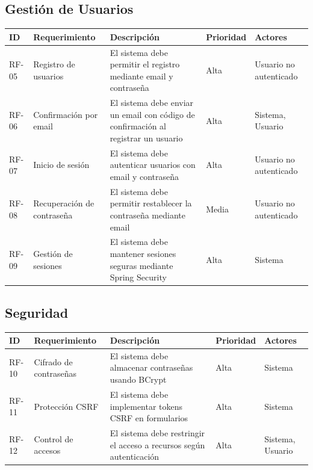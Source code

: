 \subsection{Gestión de Usuarios}

\begin{longtable}{|>{\raggedright\arraybackslash}p{1.25cm}|>{\raggedright\arraybackslash}p{3.5cm}|>{\raggedright\arraybackslash}p{5.5cm}|>{\raggedright\arraybackslash}p{1.75cm}|>{\raggedright\arraybackslash}p{2.5cm}|}
\hline
\textbf{ID} & \textbf{Requerimiento} & \textbf{Descripción} & \textbf{Prioridad} & \textbf{Actores} \\
\hline
RF-05 & Registro de usuarios & El sistema debe permitir el registro mediante email y contraseña & Alta & Usuario no autenticado \\
\hline
RF-06 & Confirmación por email & El sistema debe enviar un email con código de confirmación al registrar un usuario & Alta & Sistema, Usuario \\
\hline
RF-07 & Inicio de sesión & El sistema debe autenticar usuarios con email y contraseña & Alta & Usuario no autenticado \\
\hline
RF-08 & Recuperación de contraseña & El sistema debe permitir restablecer la contraseña mediante email & Media & Usuario no autenticado \\
\hline
RF-09 & Gestión de sesiones & El sistema debe mantener sesiones seguras mediante Spring Security & Alta & Sistema \\
\hline
\end{longtable}


\subsection{Seguridad}

\begin{longtable}{|>{\raggedright\arraybackslash}p{1.25cm}|>{\raggedright\arraybackslash}p{3.5cm}|>{\raggedright\arraybackslash}p{5.5cm}|>{\raggedright\arraybackslash}p{1.75cm}|>{\raggedright\arraybackslash}p{2.5cm}|}
\hline
\textbf{ID} & \textbf{Requerimiento} & \textbf{Descripción} & \textbf{Prioridad} & \textbf{Actores} \\
\hline
RF-10 & Cifrado de contraseñas & El sistema debe almacenar contraseñas usando BCrypt & Alta & Sistema \\
\hline
RF-11 & Protección CSRF & El sistema debe implementar tokens CSRF en formularios & Alta & Sistema \\
\hline
RF-12 & Control de accesos & El sistema debe restringir el acceso a recursos según autenticación & Alta & Sistema, Usuario \\
\hline
\end{longtable}


